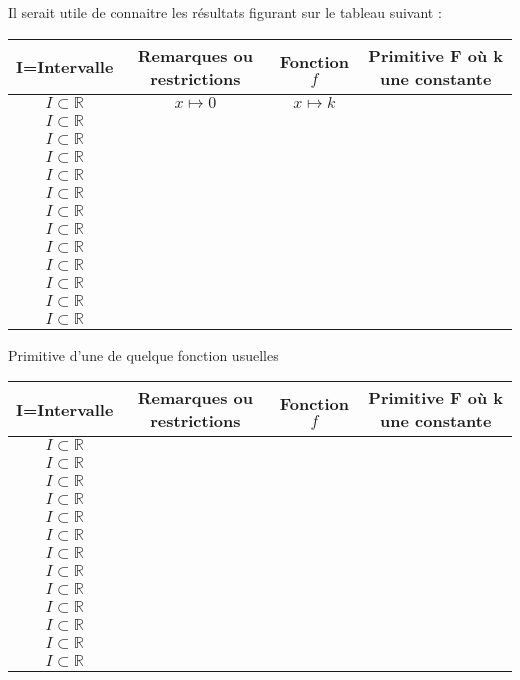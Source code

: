 \documentclass[12pt]{article}
\begin{document}
Il serait utile de connaitre les résultats figurant sur le tableau suivant :
\begin{center}
\begin{tabular}{|c|c|c|c|}
\hline
I=Intervalle &Remarques ou restrictions & Fonction $f$ & Primitive F où k une constante \\
\hline
$I \subset \mathbb{R}$& $x\mapsto 0$ & $x\mapsto k$ &\\
\hline
$I \subset \mathbb{R}$ & & &\\
\hline
$I \subset \mathbb{R}$& & &\\
\hline
$I \subset \mathbb{R}$& & &\\
\hline
$I \subset \mathbb{R}$& & &\\
\hline
$I \subset \mathbb{R}$& & &\\
\hline
$I \subset \mathbb{R}$& & &\\
\hline
$I \subset \mathbb{R}$ & & &\\
\hline
$I \subset \mathbb{R}$& & &\\
\hline
$I \subset \mathbb{R}$& & &\\
\hline
$I \subset \mathbb{R}$& & &\\
\hline
$I \subset \mathbb{R}$& & &\\
\hline
$I \subset \mathbb{R}$& & &\\
\hline
\end{tabular}
\end{center}

Primitive d'une de quelque fonction usuelles

\begin{center}
\begin{tabular}{|c|c|c|c|}
\hline
I=Intervalle &Remarques ou restrictions & Fonction $f$ & Primitive F où k une constante \\
\hline
$I \subset \mathbb{R}$& & &\\
\hline
$I \subset \mathbb{R}$ & & &\\
\hline
$I \subset \mathbb{R}$& & &\\
\hline
$I \subset \mathbb{R}$& & &\\
\hline
$I \subset \mathbb{R}$& & &\\
\hline
$I \subset \mathbb{R}$& & &\\
\hline
$I \subset \mathbb{R}$& & &\\
\hline
$I \subset \mathbb{R}$ & & &\\
\hline
$I \subset \mathbb{R}$& & &\\
\hline
$I \subset \mathbb{R}$& & &\\
\hline
$I \subset \mathbb{R}$& & &\\
\hline
$I \subset \mathbb{R}$&  & &\\
\hline
$I \subset \mathbb{R}$&  &  &\\
\hline
\end{tabular}
\end{center}
\end{document}
